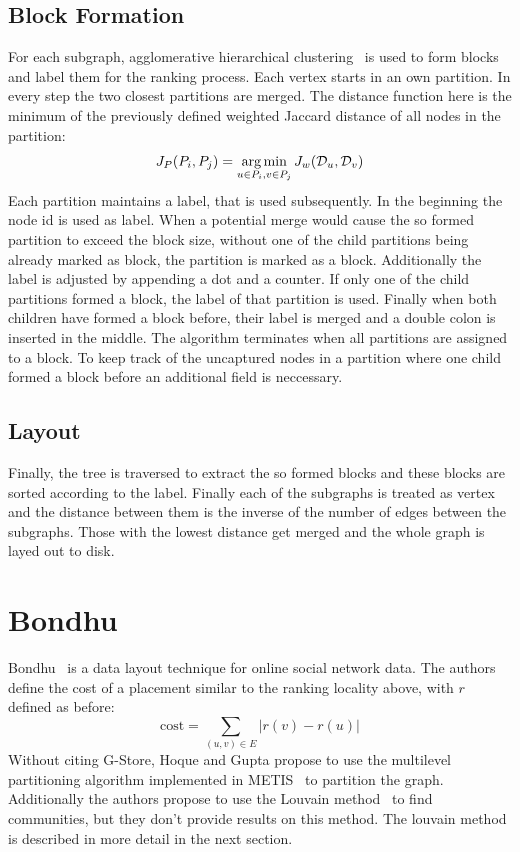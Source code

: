     \subsection*{Block Formation}
    For each subgraph, agglomerative hierarchical clustering~\autocite{hac} is used to form blocks and label them for the ranking process.
    Each vertex starts in an own partition. 
    In every step the two closest partitions are merged. 
    The distance function here is the minimum of the previously defined weighted Jaccard distance of all nodes in the partition:
    \[ J_P (P_i, P_j) = \operatorname*{arg\,min}_{u \in P_i, v \in P_j} J_w (\mathcal{D}_u, \mathcal{D}_v) \]
    Each partition maintains a label, that is used subsequently.
    In the beginning the node id is used as label. 
    When a potential merge would cause the so formed partition to exceed the block size, without one of the child partitions being already marked as block, the partition is marked as a block.
    Additionally the label is adjusted by appending a dot and a counter.
    If only one of the child partitions formed a block, the label of that partition is used.
    Finally when both children have formed a block before, their label is merged and a double colon is inserted in the middle.
    The algorithm terminates when all partitions are assigned to a block.
    To keep track of the uncaptured nodes in a partition where one child formed a block before an additional field is neccessary.    
    
    
    \subsection*{Layout}
    Finally, the tree is traversed to extract the so formed blocks and these blocks are sorted according to the label. 
    Finally each of the subgraphs is treated as vertex and the distance between them is the inverse of the number of edges between the subgraphs. Those with the lowest distance get merged and the whole graph is layed out to disk.
    

\section{Bondhu}
    Bondhu~\autocite{hoque2012disk} is a data layout technique for online social network data. 
    The authors define the cost of a placement similar to the ranking locality above, with $r$ defined as before: \[ \text{cost} = \sum_{(u, v) \in E} |r(v) - r(u)| \]   
    Without citing G-Store, Hoque and Gupta propose to use the multilevel partitioning algorithm implemented in METIS~\autocite{karypis} to partition the graph. Additionally the authors propose to use the Louvain method~\autocite{blondel2008fast} to find communities, but they don't provide results on this method. The louvain method is described in more detail in the next section. \\
    
